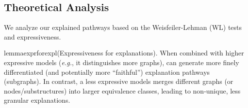 \subsection{Theoretical Analysis}
We analyze our explained pathways based on the Weisfeiler-Lehman (WL) tests and expressiveness.
\begin{restatable}{lemma}{exprforexpl}(Expressiveness for explanations).
\label{lmm:expr_for_expl}
When combined with higher expressive models
(\emph{e.g.}, it distinguishes more graphs), 
\explainer can generate more finely differentiated (and potentially 
more ``faithful'') explanation pathways (subgraphs). 
In contrast, a less expressive models
merges different graphs (or nodes/substructures) into larger equivalence classes, 
leading to non-unique, less granular explanations.
\end{restatable}



